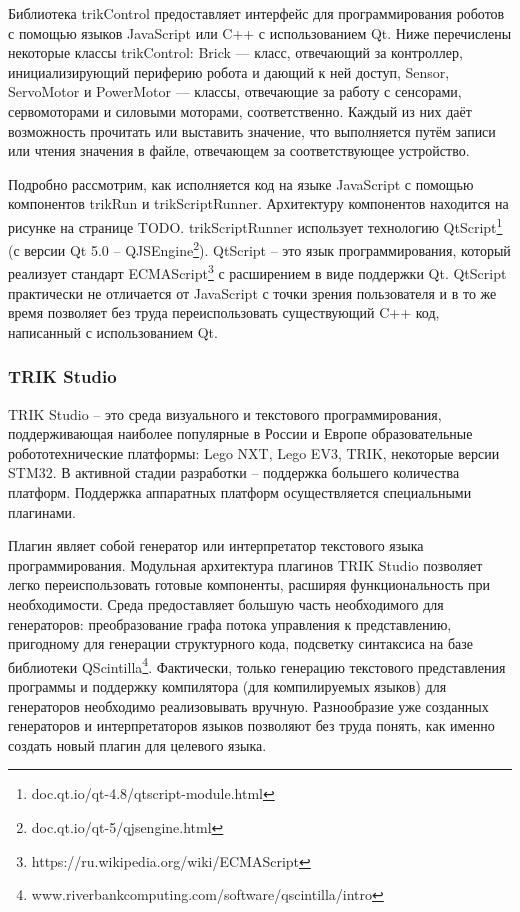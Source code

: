 \documentclass[14pt]{matmex-diploma-custom}
\begin{document}
Библиотека trikControl предоставляет интерфейс для программирования роботов с помощью языков JavaScript или C++ с использованием Qt. Ниже перечислены некоторые классы trikControl: Brick — класс, отвечающий за контроллер, инициализирующий периферию робота и дающий к ней доступ, Sensor, ServoMotor и PowerMotor — классы, отвечающие за работу с сенсорами, сервомоторами и силовыми моторами, соответственно. Каждый из них даёт возможность прочитать или выставить значение, что выполняется путём записи или чтения значения в файле, отвечающем за соответствующее устройство.


Подробно рассмотрим, как исполняется код на языке JavaScript с помощью компонентов trikRun и trikScriptRunner. Архитектуру компонентов находится на рисунке на странице TODO. trikScriptRunner использует технологию QtScript\footnote{doc.qt.io/qt-4.8/qtscript-module.html} (с версии Qt 5.0 -- QJSEngine\footnote{doc.qt.io/qt-5/qjsengine.html}). QtScript -- это язык программирования, который реализует стандарт ECMAScript\footnote{https://ru.wikipedia.org/wiki/ECMAScript} с расширением в виде поддержки Qt. QtScript практически не отличается от JavaScript с точки зрения пользователя и в то же время позволяет без труда переиспользовать существующий C++ код, написанный с использованием Qt. 

\subsubsection{TRIK Studio}
TRIK Studio -- это среда визуального и текстового программирования, поддерживающая наиболее популярные в России и Европе образовательные робототехнические платформы: Lego NXT, Lego EV3, TRIK, некоторые версии STM32. В активной стадии разработки -- поддержка большего количества платформ. Поддержка аппаратных платформ осуществляется специальными плагинами. 

Плагин являет собой генератор или интерпретатор текстового языка программирования. Модульная архитектура плагинов TRIK Studio позволяет легко переиспользовать готовые компоненты, расширяя функциональность при необходимости. Среда предоставляет большую часть необходимого для генераторов: преобразование графа потока управления к представлению, пригодному для генерации структурного кода, подсветку синтаксиса на базе библиотеки QScintilla\footnote{www.riverbankcomputing.com/software/qscintilla/intro}. Фактически, только генерацию текстового представления программы и поддержку компилятора (для компилируемых языков) для генераторов необходимо реализовывать вручную. Разнообразие уже созданных генераторов и интерпретаторов языков позволяют без труда понять, как именно создать новый плагин для целевого языка.
\end{document}
